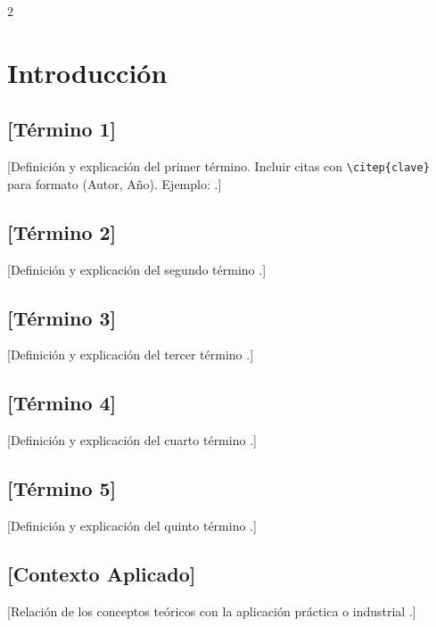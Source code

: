 \documentclass[12pt, a4paper]{article}
\begin{document}
\begin{multicols}{2}

\section{Introducción}

\subsection{[Término 1]}
[Definición y explicación del primer término. Incluir citas con \texttt{\textbackslash citep\{clave\}} para formato (Autor, Año). Ejemplo: \citep[p.~XX]{Referencia2023}.]

\subsection{[Término 2]}
[Definición y explicación del segundo término \citep[p.~XX]{Referencia2023}.]

\subsection{[Término 3]}
[Definición y explicación del tercer término \citep[p.~XX]{Referencia2023}.]

\subsection{[Término 4]}
[Definición y explicación del cuarto término \citep[p.~XX]{Referencia2023}.]

\subsection{[Término 5]}
[Definición y explicación del quinto término \citep[p.~XX]{Referencia2023}.]

\subsection{[Contexto Aplicado]}
[Relación de los conceptos teóricos con la aplicación práctica o industrial \citep[p.~XX]{Referencia2023}.]


\end{multicols}
\end{document}
